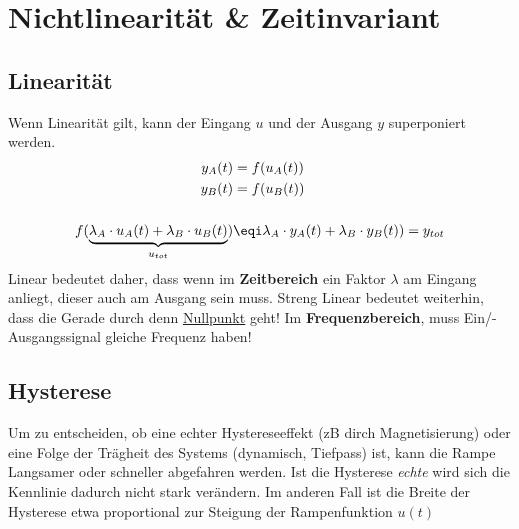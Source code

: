 \section{Nichtlinearität \& Zeitinvariant}

\subsection{Linearität}
Wenn Linearität gilt, kann der Eingang $u$ und der Ausgang $y$ superponiert werden.
\begin{align*}
	y_A(t) &= f(u_A(t))  \\
	y_B(t) &= f(u_B(t))  \\ \\
	f(\underbrace{\lambda_A\cdot u_A(t) + \lambda_B\cdot u_B(t)}_{u_{tot}}) &\eqi \lambda_A\cdot y_A(t) + \lambda_B\cdot y_B(t)) = y_{tot}
\end{align*}
Linear bedeutet daher, dass wenn im \textbf{Zeitbereich} ein Faktor $\lambda$ am Eingang anliegt, dieser auch am Ausgang sein muss. Streng Linear bedeutet weiterhin, dass die Gerade durch denn \underline{Nullpunkt} geht!
Im \textbf{Frequenzbereich}, muss Ein/-Ausgangssignal gleiche Frequenz haben!

\subsection{Hysterese}
Um zu entscheiden, ob eine echter Hystereseeffekt (zB dirch Magnetisierung) oder eine Folge der Trägheit des Systems (dynamisch, Tiefpass) ist, kann die Rampe Langsamer oder schneller abgefahren werden. Ist die Hysterese \textit{echte} wird sich die Kennlinie dadurch nicht stark verändern. Im anderen Fall ist die Breite der Hysterese etwa proportional zur Steigung der Rampenfunktion $u(t)$

